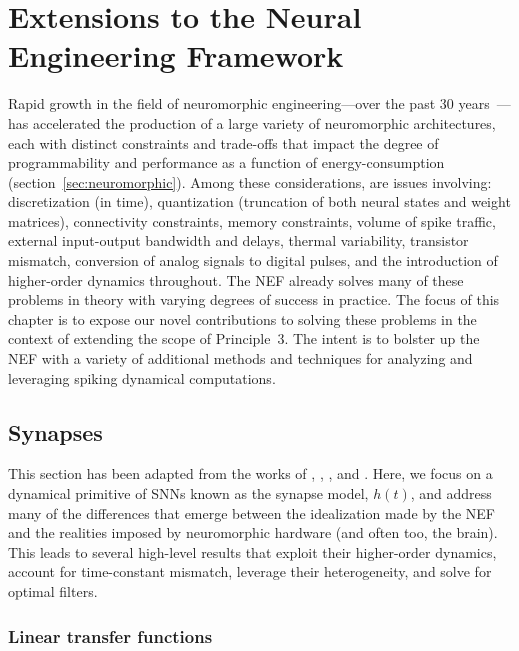\chapter{Extensions to the Neural Engineering Framework}
\label{chapt:nef-extensions}

Rapid growth in the field of neuromorphic engineering---over the past 30 years~\citep{mead1988silicon}---has accelerated the production of a large variety of neuromorphic architectures, each with distinct constraints and trade-offs that impact the degree of programmability and performance as a function of energy-consumption (section~\ref{sec:neuromorphic}).
Among these considerations, are issues involving:
discretization (in time), quantization (truncation of both neural states and weight matrices), connectivity constraints, memory constraints, volume of spike traffic, external input-output bandwidth and delays, thermal variability, transistor mismatch, conversion of analog signals to digital pulses, and the introduction of higher-order dynamics throughout.
The NEF already solves many of these problems in theory with varying degrees of success in practice.
The focus of this chapter is to expose our novel contributions to solving these problems in the context of extending the scope of Principle~3.
The intent is to bolster up the NEF with a variety of additional methods and techniques for analyzing and leveraging spiking dynamical computations.

\section{Synapses}
\label{sec:synaptic-extensions}

This section has been adapted from the works of \citet[][patent pending]{dynamicspatent}, \citet{voelker2017iscas}, \citet{voelker2017neuromorphic}, and \citet{voelker2018}.
Here, we focus on a dynamical primitive of SNNs known as the synapse model, $h(t)$, and address many of the differences that emerge between the idealization made by the NEF and the realities imposed by neuromorphic hardware (and often too, the brain).
This leads to several high-level results that exploit their higher-order dynamics, account for time-constant mismatch, leverage their heterogeneity, and solve for optimal filters.

\subsection{Linear transfer functions}
\label{sec:linear-extensions}


